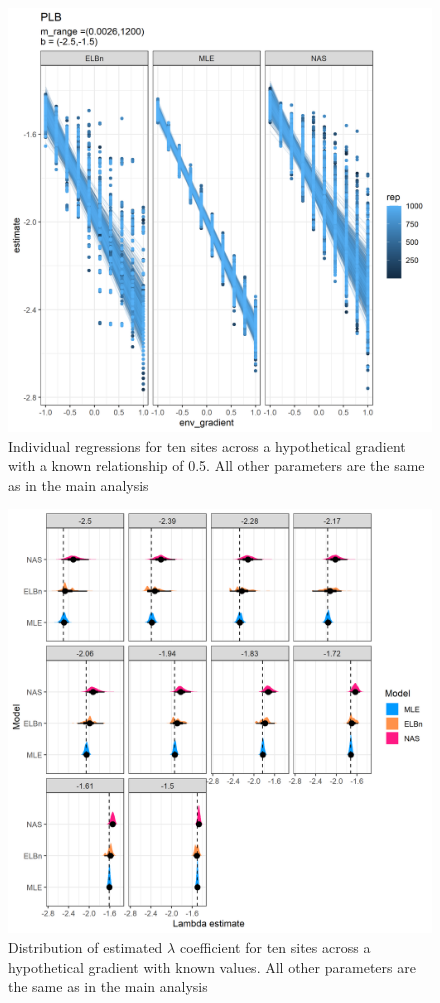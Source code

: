 \documentclass[
]{article}
\begin{document}
\begin{figure}
\centering
\includegraphics{figures/PLB_10_sites_main.png}
\caption{Individual regressions for ten sites across a hypothetical
gradient with a known relationship of 0.5. All other parameters are the
same as in the main analysis}
\end{figure}

\newpage

\begin{figure}
\centering
\includegraphics{figures/PLB_10_sites_est_b_density.png}
\caption{Distribution of estimated \(\lambda\) coefficient for ten sites
across a hypothetical gradient with known values. All other parameters
are the same as in the main analysis}
\end{figure}
\end{document}

